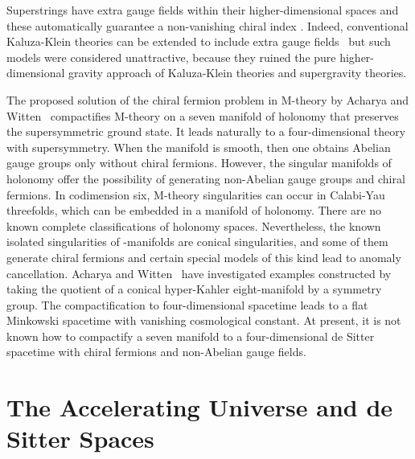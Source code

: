\documentclass[a4paper,12pt]{article}
\begin{document}
Superstrings have extra gauge fields within their
higher-dimensional spaces and these automatically guarantee a non-vanishing chiral
index \coordHE{}. Indeed, conventional Kaluza-Klein theories can be extended to include
extra gauge fields~\cite{Salam} but such models were considered unattractive,
because they ruined the pure higher-dimensional gravity approach of Kaluza-Klein
theories and supergravity theories.

The proposed solution of the chiral fermion problem in M-theory by Acharya and
Witten~\cite{Acharya} compactifies M-theory on a seven manifold \coordHE{} of \coordHE{}
holonomy that preserves the supersymmetric ground state. It leads naturally to
a four-dimensional theory with \coordHE{} supersymmetry. When the manifold \coordHE{} is smooth,
then one obtains Abelian gauge groups only without chiral fermions. However, the
singular manifolds of \coordHE{} holonomy offer the possibility of generating non-Abelian
gauge groups and chiral fermions. In codimension six, M-theory singularities can
occur in Calabi-Yau threefolds, which can be embedded in a manifold of \coordHE{}
holonomy. There are no known complete classifications of \coordHE{} holonomy spaces.
Nevertheless, the known isolated singularities of \coordHE{}-manifolds are conical
singularities, and some of them generate chiral fermions and certain special models
of this kind lead to anomaly cancellation. Acharya and Witten~\cite{Acharya} have
investigated examples constructed by taking the quotient of a conical hyper-Kahler
eight-manifold by a \coordHE{} symmetry group. The compactification to four-dimensional
spacetime leads to a flat Minkowski spacetime with vanishing cosmological constant.
At present, it is not known how to compactify a seven manifold to a four-dimensional
de Sitter spacetime with chiral fermions and non-Abelian gauge fields.


\section{\bf The Accelerating Universe and de Sitter Spaces}
\end{document}
